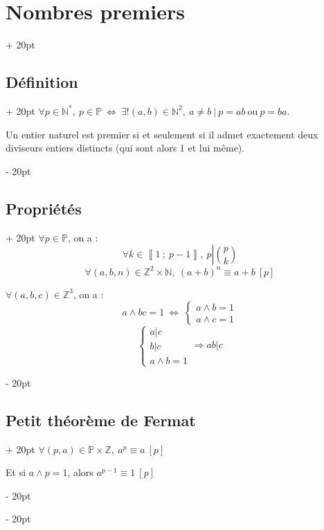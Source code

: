 \documentclass[a4paper, 12pt, twoside]{article}
\newcommand{\N}{\mathbb{N}} %
\newcommand{\Z}{\mathbb{Z}} %
\newcommand{\nset}[2]{\left\llbracket #1\ ;\ #2 \right\rrbracket}
\newcommand{\ssi}{\ \Leftrightarrow \ }
\newcommand{\eqsys}[2]{\begin{cases} #1 \\ #2 \end{cases}}
\newcommand{\ind}[1][20pt]{\advance\leftskip + #1}
\newcommand{\deind}[1][20pt]{\advance\leftskip - #1}
\newenvironment{indt}[2][20pt]{#2 \par \ind[#1]}{\par \deind} %
\begin{document}
    \begin{indt}{\section{Nombres premiers}}
        
        \begin{indt}{\subsection{Définition}}
            $\forall p \in \N^*,\ p \in \mathbb{P} \ssi \exists! (a, b) \in \N^2,\ a \neq b\ |\ p = ab\ \text{ou}\ p = ba$.
            
            Un entier naturel est premier si et seulement si il admet exactement deux diviseurs entiers distincts (qui sont alors 1 et lui même).
        \end{indt}
        
        \vspace{6pt}
        
        \begin{indt}{\subsection{Propriétés}}
            $\forall p \in \mathbb P$, on a :
                \[ \forall k \in \nset{1}{p - 1},\ p \left| \binom{p}{k} \right. \]
                \[ \forall (a, b, n) \in \Z^2 \times \N,\ (a + b)^n \equiv a + b\ [p] \]
            
            \vspace{6pt}
            
            $\forall (a, b, c) \in \Z^3$, on a :
                \[ a \wedge bc = 1 \ssi \eqsys{a \wedge b = 1}{a \wedge c = 1} \]
                \[
                    \begin{cases}
                        a|c
                        \\
                        b|c
                        \\
                        a \wedge b = 1
                    \end{cases}
                    \Rightarrow ab|c
                \]
        \end{indt}
        
        \vspace{6pt}
        
        \begin{indt}{\subsection{Petit théorème de Fermat}}
            $\forall (p, a) \in \mathbb P \times \Z,\ a^p \equiv a\ [p]$
            
            Et si $a \wedge p = 1$, alors $a^{p - 1} \equiv 1\ [p]$
        \end{indt}
        
    \end{indt}




    

    
    
\end{document}
